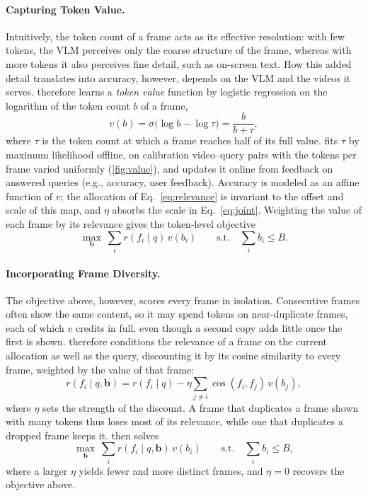 \paragraph{Capturing Token Value.}
Intuitively, the token count of a frame acts as its effective resolution: with few tokens, the VLM perceives only the coarse structure of the frame, whereas with more tokens it also perceives fine detail, such as on-screen text. How this added detail translates into accuracy, however, depends on the VLM and the videos it serves. \name therefore learns a \textit{token value} function by logistic regression on the logarithm of the token count $b$ of a frame,
\begin{equation}
  v(b)=\sigma\big(\log b-\log\tau\big)=\frac{b}{b+\tau} ,
  \label{eq:curve}
\end{equation}
where $\tau$ is the token count at which a frame reaches half of its full value. \name fits $\tau$ by maximum likelihood offline, on calibration video--query pairs with the tokens per frame varied uniformly (\cref{fig:value}), and updates it online from feedback on answered queries (e.g., accuracy, user feedback). Accuracy is modeled as an affine function of $v$; the allocation of Eq.~\eqref{eq:relevance} is invariant to the offset and scale of this map, and $\eta$ absorbs the scale in Eq.~\eqref{eq:joint}. Weighting the value of each frame by its relevance gives the token-level objective
\begin{equation}
  \max_{\mathbf b}\ \sum_{i}r(f_i\mid q)\,v(b_i)\qquad\text{s.t.}\quad\sum_{i}b_i\le B .
  \label{eq:relevance}
\end{equation}

\paragraph{Incorporating Frame Diversity.}
The objective above, however, scores every frame in isolation. Consecutive frames often show the same content, so it may spend tokens on near-duplicate frames, each of which $v$ credits in full, even though a second copy adds little once the first is shown. \name therefore conditions the relevance of a frame on the current allocation as well as the query, discounting it by its cosine similarity to every frame, weighted by the value of that frame:
\begin{equation}
  r(f_i\mid q,\mathbf b)=r(f_i\mid q)-\eta\sum_{j\ne i}\cos(f_i,f_j)\,v(b_j) ,
  \label{eq:cond}
\end{equation}
where $\eta$ sets the strength of the discount. A frame that duplicates a frame shown with many tokens thus loses most of its relevance, while one that duplicates a dropped frame keeps it. \name then solves
\begin{equation}
  \max_{\mathbf b}\ \sum_{i}r(f_i\mid q,\mathbf b)\,v(b_i)\qquad\text{s.t.}\quad\sum_{i}b_i\le B ,
  \label{eq:p1}
\end{equation}
where a larger $\eta$ yields fewer and more distinct frames, and $\eta=0$ recovers the objective above.

